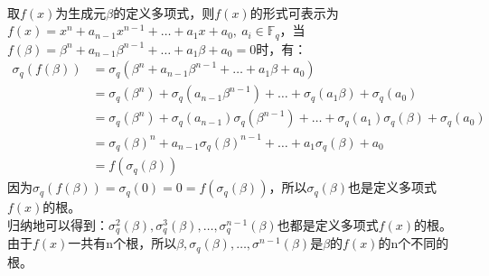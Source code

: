\begin{solution}\ \\
    取$f(x)$为生成元$\beta$的定义多项式，则$f(x)$的形式可表示为$f(x)=x^n+a_{n-1}x^{n-1}+\dots+a_1x+a_0,\ a_i\in\mathbb{F}_{q}$，当$f(\beta)=\beta^n+a_{n-1}\beta^{n-1}+\dots+a_1\beta+a_0=0$时，有：
    \begin{equation*}
        \begin{aligned}
            \sigma_q(f(\beta))
            &=\sigma_q(\beta^n+a_{n-1}\beta^{n-1}+\dots+a_1\beta+a_0)\\
            &=\sigma_q(\beta^n)+\sigma_q(a_{n-1}\beta^{n-1})+\dots+\sigma_q(a_1\beta)+\sigma_q(a_0)\\
            &=\sigma_q(\beta^n)+\sigma_q(a_{n-1})\sigma_q(\beta^{n-1})+\dots+\sigma_q(a_1)\sigma_q(\beta)+\sigma_q(a_0)\\
            &=\sigma_q(\beta)^n+a_{n-1}\sigma_q(\beta)^{n-1}+\dots+a_1\sigma_q(\beta)+a_0\\
            &=f(\sigma_q(\beta))
        \end{aligned}
    \end{equation*}
    因为$\sigma_q(f(\beta))=\sigma_q(0)=0=f(\sigma_q(\beta))$，所以$\sigma_q(\beta)$也是定义多项式$f(x)$的根。\\
    归纳地可以得到：$\sigma_{q}^2(\beta),\sigma_{q}^3(\beta),\dots,\sigma_q^{n-1}(\beta)$也都是定义多项式$f(x)$的根。\\
    由于$f(x)$一共有n个根，所以$\beta,\sigma_q(\beta),\dots,\sigma^{n-1}(\beta)$是$\beta$的$f(x)$的n个不同的根。
\end{solution}